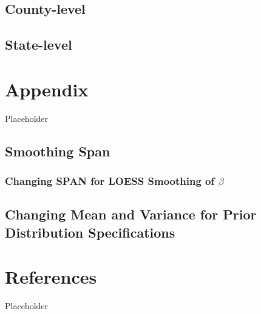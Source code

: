 \documentclass[12pt,twoside]{smiththesis}
\begin{document}
\hypertarget{county-level-1}{%
\section{County-level}\label{county-level-1}}

\hypertarget{state-level-1}{%
\section{State-level}\label{state-level-1}}

\hypertarget{appendix}{%
\chapter{Appendix}\label{appendix}}

Placeholder

\hypertarget{smoothing-span}{%
\section{Smoothing Span}\label{smoothing-span}}

\hypertarget{changing-span-for-loess-smoothing-of-beta}{%
\subsection{\texorpdfstring{Changing SPAN for LOESS Smoothing of \(\beta\)}{Changing SPAN for LOESS Smoothing of \textbackslash beta}}\label{changing-span-for-loess-smoothing-of-beta}}

\hypertarget{changing-mean-and-variance-for-prior-distribution-specifications}{%
\section{Changing Mean and Variance for Prior Distribution Specifications}\label{changing-mean-and-variance-for-prior-distribution-specifications}}

\hypertarget{references}{%
\chapter*{References}\label{references}}

Placeholder


\end{document}

